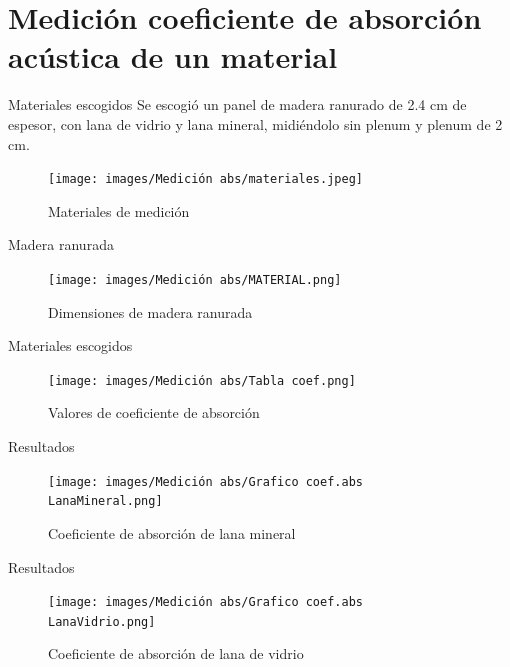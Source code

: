 \documentclass{sintefbeamer}
\begin{document}
\section{Medición coeficiente de absorción acústica de un material}
\begin{frame}{Materiales escogidos}
    Se escogió un panel de madera ranurado de 2.4 cm de espesor, con lana de vidrio y lana mineral, midiéndolo sin plenum y plenum de 2 cm.
    \begin{figure}[H]
        \centering
        \texttt{[image: images/Medición abs/materiales.jpeg]}
        \caption{Materiales de medición}
        \label{fig: materiales a medir}
    \end{figure}
\end{frame}

\begin{frame}{Madera ranurada}
    \begin{figure}[H]
        \centering
        \texttt{[image: images/Medición abs/MATERIAL.png]}
        \caption{Dimensiones de madera ranurada}
        \label{fig: madera ranurada}
    \end{figure}
\end{frame}

\begin{frame}{Materiales escogidos}
    \begin{figure}
        \centering
        \texttt{[image: images/Medición abs/Tabla coef.png]}
        \caption{Valores de coeficiente de absorción}
        \label{fig:enter-label}
    \end{figure}
\end{frame}

\begin{frame}{Resultados}
    \begin{figure}
        \centering
        \texttt{[image: images/Medición abs/Grafico coef.abs LanaMineral.png]}
        \caption{Coeficiente de absorción de lana mineral}
        \label{fig:grafico coef Lana mineral}
    \end{figure}
\end{frame}

\begin{frame}{Resultados}
    \begin{figure}
        \centering
        \texttt{[image: images/Medición abs/Grafico coef.abs LanaVidrio.png]}
        \caption{Coeficiente de absorción de lana de vidrio}
        \label{fig:grafico coef Lana vidrio}
    \end{figure}
\end{frame}
\end{document}
